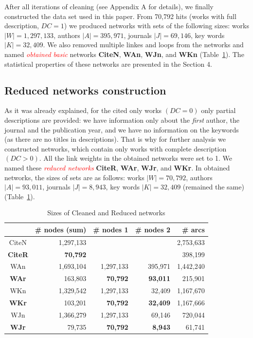 \documentclass[11pt]{article} %
\newcommand{\keyw}[1]{\textcolor{red}{\emph{#1}}}
\begin{document}
After all iterations of cleaning (see Appendix A for details), we finally constructed the data set used in this paper. From 70,792 hits (works with full description, $DC=1$) we produced networks with sets of the following sizes: works $|W| = 1,297,133$, authors $|A| = 395,971$, journals $|J| = 69,146$, key words $|K| = 32,409$. We also removed multiple linkes and loops from the networks and named \keyw{obtained basic} networks \textbf{CiteN}, \textbf{WAn}, \textbf{WJn}, and \textbf{WKn} (Table~\ref{rednet}). The statistical properties of these networks are presented in the Section 4. \medskip  

\subsection{Reduced networks construction}

As it was already explained, for the cited only  works  $(DC=0)$ only partial descriptions are provided: we have information only about the \textit{first} author, the journal and the publication year, and we have no information on the keywords (as there are no titles in descriptions). That is why for further analysis we constructed networks, which contain only works with complete description $(DC>0)$. All the link weights in the obtained networks were set to 1. We named these \keyw{reduced networks} \textbf{CiteR}, \textbf{WAr}, \textbf{WJr}, and \textbf{WKr}. In obtained networks, the sizes of sets are as follows: works $|W| = 70,792$, authors $|A| = 93,011$, journals $|J| = 8,943$, key words $|K| = 32,409$ (remained the same) (Table~\ref{rednet}). \medskip 

\begin{table}
\caption{Sizes of Cleaned and Reduced networks}\label{rednet}\medskip
\begin{center}
\begin{tabular}{c|r|r|r|r}
	&\# nodes (sum)	& \# nodes 1	&\# nodes 2	& \# arcs \\ \hline		 
CiteN & 1,297,133 & & & 2,753,633\\ 
\textbf{CiteR} & \textbf{70,792} & & & 398,199 \\ \hline
WAn	& 1,693,104	& 1,297,133	& 395,971	& 1,442,240 \\ 	
\textbf{WAr}	& 163,803	& \textbf{70,792}	& \textbf{93,011}	& 215,901 \\ \hline
WKn &  	1,329,542	& 1,297,133	& 32,409	& 1,167,670 \\  
\textbf{WKr}	& 103,201	& \textbf{70,792}	& \textbf{32,409}	& 1,167,666 \\ \hline
WJn & 	1,366,279	& 1,297,133	& 69,146	& 720,044    \\ 	
\textbf{WJr} 	& 79,735	& \textbf{70,792}	& \textbf{8,943}	& 61,741 \\ \hline
\end{tabular}				
\end{center}
\end{table}
\end{document}
